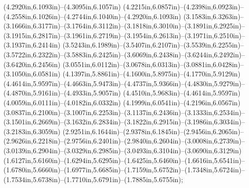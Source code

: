 (4.2920in,6.1093in)--(4.3095in,6.1057in) (4.2215in,6.0857in)--(4.2398in,6.0923in)--(4.2558in,6.1026in)--(4.2744in,6.1040in)--(4.2920in,6.1093in) (3.1583in,6.3263in)--(3.1666in,6.3177in)--(3.1764in,6.3112in)--(3.1818in,6.3010in)--(3.1891in,6.2925in)--(3.1915in,6.2817in)--(3.1961in,6.2719in)--(3.1954in,6.2613in)--(3.1971in,6.2510in)--(3.1937in,6.2414in) (3.5243in,6.1989in)--(3.5407in,6.2107in)--(3.5539in,6.2255in)--(3.5722in,6.2322in)--(3.5883in,6.2425in)--(3.6069in,6.2438in)--(3.6244in,6.2492in)--(3.6420in,6.2456in) (3.0551in,6.0112in)--(3.0678in,6.0313in)--(3.0881in,6.0428in)--(3.1050in,6.0581in) (4.1397in,5.8861in)--(4.1600in,5.8975in)--(4.1770in,5.9129in) (4.4614in,5.9597in)--(4.4663in,5.9473in)--(4.4737in,5.9366in)--(4.4830in,5.9279in)--(4.4870in,5.9161in)--(4.4933in,5.9057in) (4.4510in,5.9683in)--(4.4614in,5.9597in) (4.0059in,6.0111in)--(4.0182in,6.0332in) (4.1999in,6.0541in)--(4.2196in,6.0567in) (3.0837in,6.2100in)--(3.1007in,6.2253in)--(3.1137in,6.2436in)--(3.1333in,6.2534in)--(3.1501in,6.2669in)--(3.1632in,6.2834in)--(3.1822in,6.2915in)--(3.1986in,6.3034in)--(3.2183in,6.3059in) (2.9251in,6.1644in)--(2.9378in,6.1845in)--(2.9456in,6.2065in)--(2.9626in,6.2218in)--(2.9756in,6.2401in)--(2.9840in,6.2604in)--(3.0008in,6.2739in)--(3.0139in,6.2904in)--(3.0329in,6.2985in)--(3.0493in,6.3104in)--(3.0690in,6.3129in)
(1.6127in,5.6160in)--(1.6294in,5.6295in)--(1.6425in,5.6460in)--(1.6616in,5.6541in)--(1.6780in,5.6660in)--(1.6977in,5.6685in)--(1.7159in,5.6752in)--(1.7348in,5.6724in)--(1.7534in,5.6738in)--(1.7710in,5.6791in)--(1.7885in,5.6755in);
